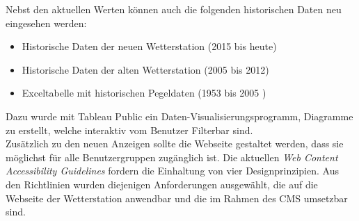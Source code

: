 \documentclass[11pt]{article}
\begin{document}
\begin{multicols}{2}
Nebst den aktuellen Werten können auch die folgenden historischen Daten neu eingesehen werden: 
\begin{itemize}
\item Historische Daten der neuen Wetterstation (2015 bis heute)
\item Historische Daten der alten Wetterstation (2005 bis 2012)
\item Exceltabelle mit historischen Pegeldaten (1953 bis 2005 )
\end{itemize}

Dazu wurde mit Tableau Public ein Daten-Visualisierungsprogramm, Diagramme zu erstellt, welche interaktiv vom Benutzer Filterbar sind.\\ 

Zusätzlich zu den neuen Anzeigen sollte die Webseite gestaltet werden, dass sie möglichst für alle Benutzergruppen zugänglich ist. Die aktuellen \emph{Web Content Accessibility Guidelines} fordern die Einhaltung von vier Designprinzipien. Aus den Richtlinien wurden diejenigen Anforderungen ausgewählt, die auf die Webseite der Wetterstation anwendbar und die im Rahmen des CMS umsetzbar sind. \\



\end{multicols}
\end{document}

